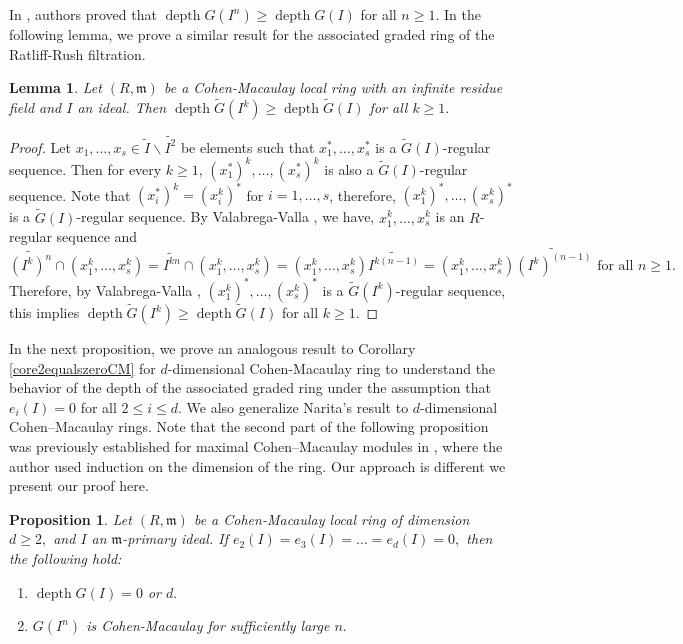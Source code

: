 \documentclass[reqno,a4paper,dvipsnames]{amsart}
\newcommand{\m}{\mathfrak{m} }
\newcommand{\depth}{\operatorname{depth}}
\newtheorem{lemma}[theorem]{Lemma}
\newtheorem{proposition}[theorem]{Proposition}
\theoremstyle{definition}
\begin{document}
In \cite{vv}, authors proved that $\depth G(I^{n}) \geq \depth G(I)$ for all $n \geq 1.$ In the following lemma, we prove a similar result for the associated graded ring of the Ratliff-Rush filtration. 


\begin{lemma}  \label{lem1}
    Let $(R,\m)$ be a Cohen-Macaulay local ring with an infinite residue field and $I$ an ideal. Then $\depth \widetilde{G}(I^{k})\geq \depth \widetilde{G}(I)$ for all $k \geq 1.$
\end{lemma}

\begin{proof}
    Let $x_{1},\ldots,x_{s} \in \widetilde{I}\backslash\widetilde{I^{2}}$  be elements such that $x_{1}^{*},\ldots,x_{s}^{*}$ is a $\widetilde{G}(I)$-regular sequence. Then for every $k\geq 1$, $(x_{1}^{*})^{k},\ldots,(x_{s}^{*})^{k}$ is also a $\widetilde{G}(I)$-regular sequence. Note that $(x_{i}^{*})^{k}=(x_{i}^{k})^{*}$ for $i=1,\ldots,s$, therefore, $(x_{1}^{k})^{*},\ldots,(x_{s}^{k})^{*}$ is a $\widetilde{G}(I)$-regular sequence. By Valabrega-Valla \cite{vv}, we have, $x_{1}^{k},\ldots,x_{s}^{k}$ is an $R$-regular sequence and
    \begin{equation*}
  \widetilde{(I^{k})^{n}}\cap(x_{1}^{k},\ldots,x_{s}^{k})
  = \widetilde{I^{kn}}\cap(x_{1}^{k},\ldots,x_{s}^{k})
        =(x_{1}^{k},\ldots,x_{s}^{k}) \widetilde{I^{k(n-1)}} 
        =(x_{1}^{k},\ldots,x_{s}^{k}) \widetilde{(I^{k})^{(n-1)}}\text{ for all } n \geq 1.
    \end{equation*}  
     Therefore, by Valabrega-Valla \cite{vv}, $(x_{1}^{k})^{*},\ldots,(x_{s}^{k})^{*}$ is a $\widetilde{G}(I^{k})$-regular sequence, this implies  $\depth \widetilde{G}(I^{k})\geq \depth \widetilde{G}(I)$ for all $k \geq 1.$
\end{proof}


In the next proposition, we prove an analogous result to Corollary \ref{core2equalszeroCM} for $d$-dimensional Cohen-Macaulay ring to understand the behavior of the depth of the associated graded ring under the assumption that $e_{i}(I)=0$ for all $2 \leq i \leq d$. We also generalize Narita's result \cite[Theorem 1]{narita} to $d$-dimensional Cohen–Macaulay rings. Note that the second part of the following proposition was previously established for maximal Cohen–Macaulay modules in \cite[Theorem 1.1 (3)]{tjp3}, where the author used induction on the dimension of the ring. Our approach is different  we present our proof here.


\begin{proposition} \label{vanishinghilbcoeffCM}
       Let $(R, \m)$ be a Cohen-Macaulay local ring of dimension $d \geq 2,$ and $I$ an $\m$-primary ideal. If $e_{2}(I)=e_{3}(I)=\ldots=e_{d}(I)=0,$ then  the following hold:
       \begin{enumerate}[\normalfont(i)]
           \item \label{mom-1} $\depth G(I) = 0$ or $d.$
           \item \label{mom-2} $G(I^{n})$ is Cohen-Macaulay for sufficiently large $n.$
       \end{enumerate}
\end{proposition}
\end{document}
